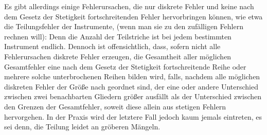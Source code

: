 Es gibt allerdings einige Fehlerursachen, die nur diskrete Fehler und keine nach dem Gesetz der Stetigkeit fortschreitenden Fehler hervorbringen können, wie etwa die Teilungsfehler der Instrumente, (wenn man sie zu den zufälligen Fehlern rechnen will): Denn die Anzahl der Teilstriche ist bei jedem bestimmten Instrument endlich. Dennoch ist offensichtlich, dass, sofern nicht alle Fehlerursachen diskrete Fehler erzeugen, die Gesamtheit aller möglichen Gesamtfehler eine nach dem Gesetz der Stetigkeit fortschreitende Reihe oder mehrere solche unterbrochenen Reihen bilden wird, falls, nachdem alle möglichen diskreten Fehler der Größe nach geordnet sind, der eine oder andere Unterschied zwischen zwei benachbarten Gliedern größer ausfällt als der Unterschied zwischen den Grenzen der Gesamtfehler, soweit diese allein aus stetigen Fehlern hervorgehen. In der Praxis wird der letztere Fall jedoch kaum jemals eintreten, es sei denn, die Teilung leidet an gröberen Mängeln.

\clearpage
